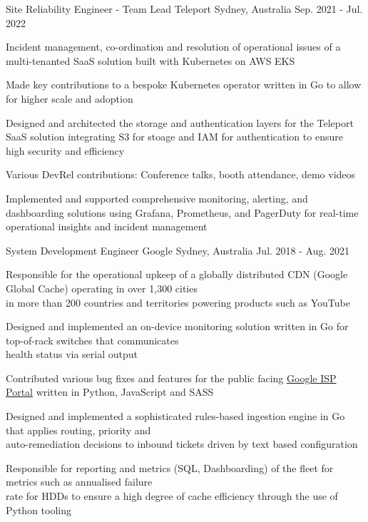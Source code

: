 \begin{cventries}
  \cventry
    {Site Reliability Engineer - Team Lead} %
    {Teleport} %
    {Sydney, Australia} %
    {Sep. 2021 - Jul. 2022} %
    {
      \begin{cvitems} %
      \item {Incident management, co-ordination and resolution of operational issues of a multi-tenanted SaaS solution built with Kubernetes on AWS EKS}
      \item {Made key contributions to a bespoke Kubernetes operator written in Go to allow for higher scale and adoption}
      \item {Designed and architected the storage and authentication layers for the Teleport SaaS solution integrating S3 for stoage and IAM for authentication to ensure high security and efficiency}
      \item {Various DevRel contributions: Conference talks, booth attendance, demo videos }
      \item {Implemented and supported comprehensive monitoring, alerting, and dashboarding solutions using Grafana, Prometheus, and PagerDuty for real-time operational insights and incident management}
      \end{cvitems}
    }


  \cventry
    {System Development Engineer} %
    {Google} %
    {Sydney, Australia} %
    {Jul. 2018 - Aug. 2021} %
    {
      \begin{cvitems} %
        \item {Responsible for the operational upkeep of a globally distributed CDN (Google Global Cache) operating in over 1,300 cities\\
         in more than 200 countries and territories powering products such as YouTube}
        \item {Designed and implemented an on-device monitoring solution written in Go for top-of-rack switches that communicates\\
         health status via serial output }
        \item {Contributed various bug fixes and features for the public facing \href{https://peering.google.com/}{Google ISP Portal} written in Python, JavaScript and SASS}
        \item {Designed and implemented a sophisticated rules-based ingestion engine in Go that applies routing, priority and\\
         auto-remediation decisions to inbound tickets driven by text based configuration}
        \item {Responsible for reporting and metrics (SQL, Dashboarding) of the fleet for metrics such as annualised failure\\
         rate for HDDs to ensure a high degree of cache efficiency through the use of Python tooling}
      \end{cvitems}
    }



\end{cventries}
